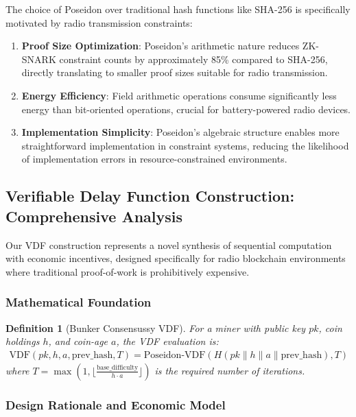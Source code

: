 \documentclass[11pt,a4paper]{article}
\newtheorem{definition}[theorem]{Definition}
\begin{document}
The choice of Poseidon over traditional hash functions like SHA-256 is specifically motivated by radio transmission constraints:

\begin{enumerate}
\item \textbf{Proof Size Optimization}: Poseidon's arithmetic nature reduces ZK-SNARK constraint counts by approximately 85\% compared to SHA-256, directly translating to smaller proof sizes suitable for radio transmission.

\item \textbf{Energy Efficiency}: Field arithmetic operations consume significantly less energy than bit-oriented operations, crucial for battery-powered radio devices.

\item \textbf{Implementation Simplicity}: Poseidon's algebraic structure enables more straightforward implementation in constraint systems, reducing the likelihood of implementation errors in resource-constrained environments.
\end{enumerate}

\subsection{Verifiable Delay Function Construction: Comprehensive Analysis}

Our VDF construction represents a novel synthesis of sequential computation with economic incentives, designed specifically for radio blockchain environments where traditional proof-of-work is prohibitively expensive.

\subsubsection{Mathematical Foundation}

\begin{definition}[Bunker Consensussy VDF]
For a miner with public key $pk$, coin holdings $h$, and coin-age $a$, the VDF evaluation is:
\begin{align}
\text{VDF}(pk, h, a, \text{prev\_hash}, T) = \text{Poseidon-VDF}(H(pk \| h \| a \| \text{prev\_hash}), T)
\end{align}
where $T = \max(1, \lfloor \frac{\text{base\_difficulty}}{h \cdot a} \rfloor)$ is the required number of iterations.
\end{definition}

\subsubsection{Design Rationale and Economic Model}
\end{document}
